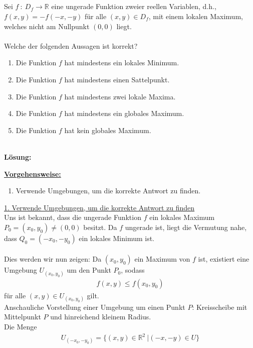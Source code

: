 \subsection*{}
Sei $ f \ : \ D_f \to \mathbb{R} $ eine ungerade Funktion zweier reellen Variablen, d.h., $f(x,y) = - f(-x,-y)$ für alle $(x,y) \in D_f$, mit einem lokalen Maximum, welches nicht am Nullpunkt $(0,0)$ liegt.\\
\\ 
Welche der folgenden Aussagen ist korrekt?
\renewcommand{\labelenumi}{(\alph{enumi})}
\begin{enumerate}
	\item Die Funktion $f$ hat mindestens ein lokales Minimum.
	\item Die Funktion $f$ hat mindestens einen Sattelpunkt.
	\item Die Funktion $f$ hat mindestens zwei lokale Maxima.
	\item Die Funktion $f$ hat mindestens ein globales Maximum.
	\item Die Funktion $f$ hat kein globales Maximum.
\end{enumerate}
\ \\
\textbf{Lösung:}
\begin{mdframed}
	\underline{\textbf{Vorgehensweise:}}
	\renewcommand{\labelenumi}{\theenumi.}
	\begin{enumerate}
		\item Verwende Umgebungen, um die korrekte Antwort zu finden.
	\end{enumerate}
\end{mdframed}
\underline{1. Verwende Umgebungen, um die korrekte Antwort zu finden}\\
Uns ist bekannt, dass die ungerade Funktion $f$ ein lokales Maximum $P_0 = (x_0,y_0) \neq (0,0)$ besitzt. 
Da $f$ ungerade ist, liegt die Vermutung nahe, dass $Q_0 = (-x_0, -y_0)$ ein lokales Minimum ist.\\
\\
Dies werden wir nun zeigen: Da $(x_0,y_0)$ ein Maximum von $f$ ist, existiert eine Umgebung $U_{(x_0,y_0)}$ um den Punkt $P_0$, sodass
\begin{align*}
	f(x,y) \leq f(x_0,y_0)
\end{align*}
für alle $(x,y) \in  U_{(x_0,y_0)}$ gilt.\\
Anschauliche Vorstellung einer Umgebung um einen Punkt $P$: 
Kreisscheibe mit Mittelpunkt $P$ und hinreichend kleinem Radius.\\
Die Menge
\begin{align*}
	U_{(-x_0,-y_0)} 
	= \{
		(x,y) \in \mathbb{R}^2 \ | (-x,-y) \in U 
	\}
\end{align*}
